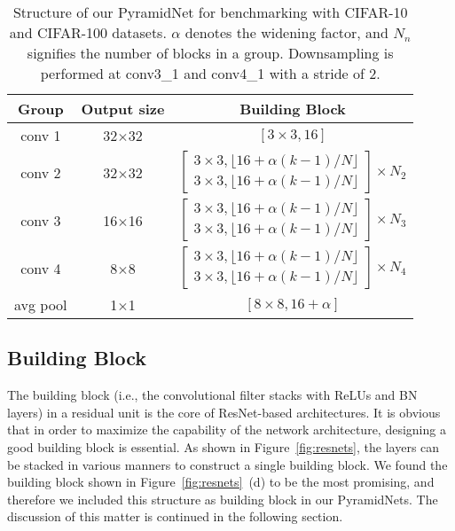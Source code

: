 \documentclass[10pt,twocolumn,letterpaper]{article}
\begin{document}
\begin{table}[t]
\footnotesize
\begin{center}
\begin{tabular}{|c|c|c|}
\hline
Group & Output size & Building Block\\
\hline\hline
conv 1 & 32$\times$32 & $\left[ \textrm{3}\times\textrm{3}, \textrm{16} \right]$\\
\hline
conv 2 & 32$\times$32 & $\left[ \begin{array}{c} \textrm{3}\times\textrm{3},  \lfloor \textrm{16} + \alpha (k-1)/N \rfloor \\ \textrm{3}\times\textrm{3},  \lfloor \textrm{16} + \alpha (k-1)/N \rfloor \end{array}\right]\times N_2$\\
\hline
conv 3 & 16$\times$16 & $\left[ \begin{array}{c} \textrm{3}\times\textrm{3}, \lfloor \textrm{16} + \alpha (k-1)/N \rfloor\\ \textrm{3}\times\textrm{3},  \lfloor \textrm{16} + \alpha (k-1)/N \rfloor \end{array}\right]\times N_3$\\
\hline
conv 4 & 8$\times$8 & $\left[ \begin{array}{c} \textrm{3}\times\textrm{3}, \lfloor \textrm{16} + \alpha (k-1)/N \rfloor\\ \textrm{3}\times\textrm{3}, \lfloor  \textrm{16} + \alpha (k-1)/N \rfloor \end{array}\right]\times N_4$\\
\hline
avg pool & 1$\times$1 & $\left[8\times8, 16+\alpha\right]$\\
\hline
\end{tabular}
\end{center}
\caption{Structure of our PyramidNet for benchmarking with CIFAR-10 and CIFAR-100 datasets. $\alpha$ denotes the widening factor, and $N_n$ signifies the number of blocks in a group. Downsampling is performed at conv3\_1 and conv4\_1 with a stride of 2. }
\label{table:structure}
\end{table}
\subsection{Building Block}
The building block (i.e., the convolutional filter stacks with ReLUs and BN layers) in a residual unit is the core of ResNet-based architectures. It is obvious that in order to maximize the capability of the network architecture, designing a good building block is essential. As shown in Figure~\ref{fig:resnets}, the layers can be stacked in various manners to construct a single building block. We found the building block shown in Figure~\ref{fig:resnets}~(d) to be the most promising, and therefore we included this structure as building block in our PyramidNets. The discussion of this matter is continued in the following section.
\end{document}
